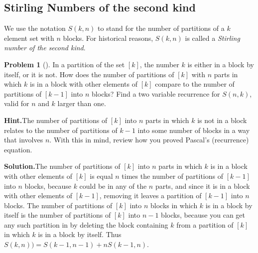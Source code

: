 \documentclass[10pt,]{book}
\theoremstyle{plain}
\theoremstyle{definition}
\newtheorem{activity}[project]{Problem}
\theoremstyle{definition}
\numberwithin{equation}{chapter}
\begin{document}
\subsection[{Stirling Numbers of the second kind}]{Stirling Numbers of the second kind}\label{subsection-27}
We use the notation \(S(k,n)\) to stand for the number of partitions of a \(k\) element set with \(n\) blocks. For historical reasons, \(S(k,n)\) is called a \emph{Stirling number of the second kind}. %
\begin{activity}[]\label{secondstirlingrecurrence}
In a partition of the set \([k]\), the number \(k\) is either in a block by itself, or it is not. How does the number of partitions of \([k]\) with \(n\) parts in which \(k\) is in a block with other elements of \([k]\) compare to the number of partitions of \([k-1]\) into \(n\) blocks? Find a two variable recurrence for \(S(n,k)\), valid for \(n\) and \(k\) larger than one.%
\par\medskip\noindent%
\textbf{Hint.}\quad The number of partitions of \([k]\) into \(n\) parts in which \(k\) is not in a block relates to the number of partitions of \(k-1\) into some number of blocks in a way that involves \(n\). With this in mind, review how you proved Pascal's (recurrence) equation.%
\par\medskip\noindent%
\textbf{Solution.}\quad The number of partitions of \([k]\) into \(n\) parts in which \(k\) is in a block with other elements of \([k]\) is equal \(n\) times the number of partitions of \([k-1]\) into \(n\) blocks, because \(k\) could be in any of the \(n\) parts, and since it is in a block with other elements of \([k-1]\), removing it leaves a partition of \([k-1]\) into \(n\) blocks. The number of partitions of \([k]\) into \(n\) blocks in which \(k\) is in a block by itself is the number of partitions of \([k]\) into \(n-1\) blocks, because you can get any such partition in by deleting the block containing \(k\) from a partition of \([k]\) in which \(k\) is in a block by itself. Thus \(S(k,n))=S(k-1,n-1) +nS(k-1,n)\).%
\end{activity}
\end{document}
